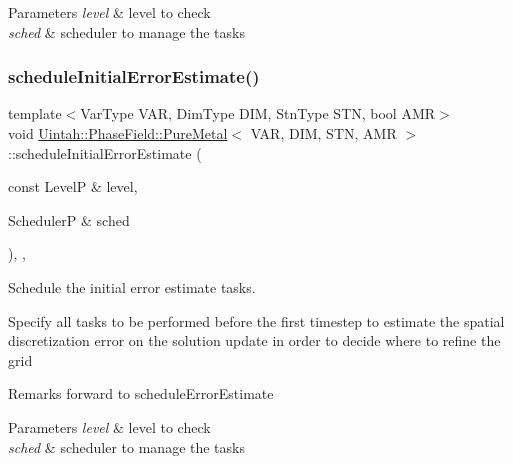 \begin{DoxyParams}{Parameters}
{\em level} & level to check \\
\hline
{\em sched} & scheduler to manage the tasks \\
\hline
\end{DoxyParams}
\mbox{\label{classUintah_1_1PhaseField_1_1PureMetal_a79a12af978b8d0d9604e6e7be725ffbe}} 
\subsubsection{\texorpdfstring{schedule\+Initial\+Error\+Estimate()}{scheduleInitialErrorEstimate()}}
{\footnotesize\ttfamily template$<$Var\+Type V\+AR, Dim\+Type D\+IM, Stn\+Type S\+TN, bool A\+MR$>$ \\
void \hyperlink{classUintah_1_1PhaseField_1_1PureMetal}{Uintah\+::\+Phase\+Field\+::\+Pure\+Metal}$<$ V\+AR, D\+IM, S\+TN, A\+MR $>$\+::schedule\+Initial\+Error\+Estimate (\begin{DoxyParamCaption}\item[{const LevelP \&}]{level,  }\item[{SchedulerP \&}]{sched }\end{DoxyParamCaption})\hspace{0.3cm}{\ttfamily [override]}, {\ttfamily [protected]}, {\ttfamily [virtual]}}



Schedule the initial error estimate tasks. 

Specify all tasks to be performed before the first timestep to estimate the spatial discretization error on the solution update in order to decide where to refine the grid

\begin{DoxyRemark}{Remarks}
forward to schedule\+Error\+Estimate
\end{DoxyRemark}

\begin{DoxyParams}{Parameters}
{\em level} & level to check \\
\hline
{\em sched} & scheduler to manage the tasks \\
\hline
\end{DoxyParams}
\mbox{\label{classUintah_1_1PhaseField_1_1PureMetal_a40c84aed55de21d116c941ae78cdfbaa}} 
